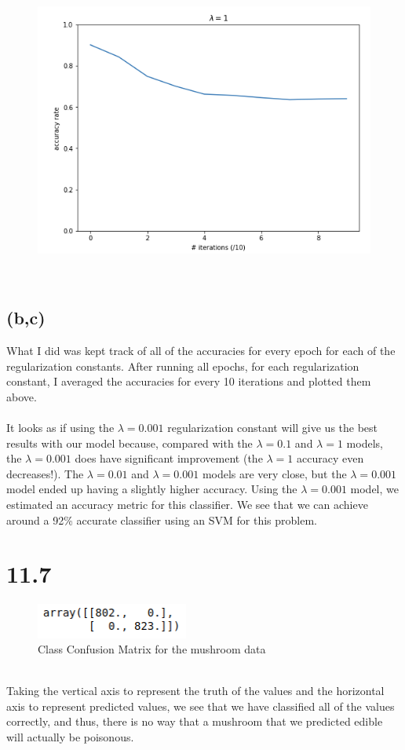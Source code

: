 \documentclass[11pt]{article}
\begin{document}
\clearpage
\begin{figure}[h!]
	\centering
	\includegraphics[width=125mm]{graph_4.png}
\end{figure}
\ \\
\subsection*{(b,c)}
What I did was kept track of all of the accuracies for every epoch for each of the regularization constants. After running all epochs, for each regularization constant, I averaged the accuracies for every 10 iterations and plotted them above. \\ \\
It looks as if using the $\lambda=0.001$ regularization constant will give us the best results with our model because, compared with the $\lambda=0.1$ and $\lambda=1$ models, the $\lambda=0.001$ does have significant improvement (the $\lambda=1$ accuracy even decreases!). The $\lambda=0.01$ and $\lambda=0.001$ models are very close, but the $\lambda=0.001$ model ended up having a slightly higher accuracy. Using the $\lambda=0.001$ model, we estimated an accuracy metric for this classifier. We see that we can achieve around a 92\% accurate classifier using an SVM for this problem.
\section*{11.7}
\begin{figure}[h!]
	\centering
	\includegraphics[width=50mm]{ccm.png}
	\caption{Class Confusion Matrix for the mushroom data}
\end{figure}
\ \\
Taking the vertical axis to represent the truth of the values and the horizontal axis to represent predicted values, we see that we have classified all of the values correctly, and thus, there is no way that a mushroom that we predicted edible will actually be poisonous.
\end{document}
